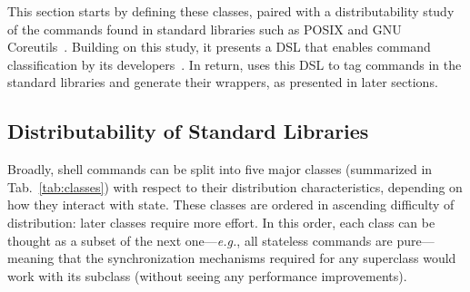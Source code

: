 \documentclass[sigplan,10pt,review,anonymous]{acmart}
\newcommand{\eg}{{\em e.g.}, }
\begin{document}
This section starts by defining these classes, paired with a distributability study of the commands found in standard libraries such as {\sc POSIX} and GNU Coreutils~.
Building on this study, it presents a DSL that enables command classification by its developers~.
In return, \sys uses this DSL to tag commands in the standard libraries and generate their wrappers, as presented in later sections.

\subsection{Distributability of Standard Libraries}
\label{cmd}

Broadly, shell commands can be split into five major classes (summarized in Tab.~\ref{tab:classes}) with respect to their distribution characteristics, depending on how they interact with state.
These classes are ordered in ascending difficulty of distribution:
  later classes require more effort.
In this order, each class can be thought as a subset of the next one---\eg all stateless commands are pure---meaning that the synchronization mechanisms required for any superclass would work with its subclass (without seeing any performance improvements).
\end{document}
